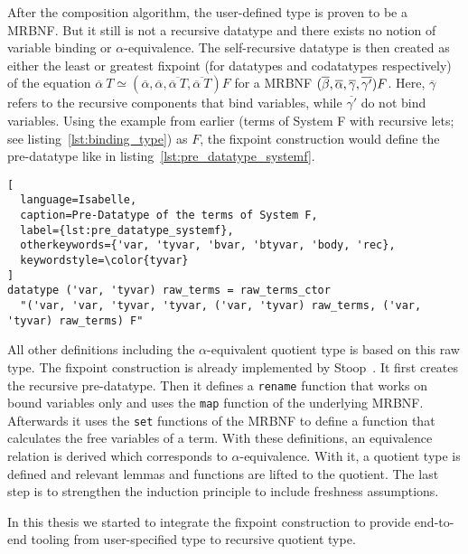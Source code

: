 After the composition algorithm, the user-defined type is proven to be a \ac{MRBNF}. But it still is not a recursive datatype and there exists no notion of variable binding or $\alpha$-equivalence. The self-recursive datatype is then created as either the least or greatest fixpoint (for datatypes and codatatypes respectively) of the equation $\overline{\alpha} \: T \simeq (\overline{\alpha}, \overline{\alpha},\overline{\overline{\alpha} \: T}, \overline{\overline{\alpha} \: T}) F$ for a \ac{MRBNF} $(\overline{\beta}, \overline{\alpha}, \overline{\gamma}, \overline{\gamma'}) F$. Here, $\overline{\gamma}$ refers to the recursive components that bind variables, while $\overline{\gamma'}$ do not bind variables. Using the example from earlier (terms of System F with recursive lets; see listing~\ref{lst:binding_type}) as $F$, the fixpoint construction would define the pre-datatype like in listing~\ref{lst:pre_datatype_systemf}.

\begin{lstlisting}[
  language=Isabelle,
  caption=Pre-Datatype of the terms of System F,
  label={lst:pre_datatype_systemf},
  otherkeywords={'var, 'tyvar, 'bvar, 'btyvar, 'body, 'rec},
  keywordstyle=\color{tyvar}
]
datatype ('var, 'tyvar) raw_terms = raw_terms_ctor
  "('var, 'var, 'tyvar, 'tyvar, ('var, 'tyvar) raw_terms, ('var, 'tyvar) raw_terms) F"
\end{lstlisting}

All other definitions including the $\alpha$-equivalent quotient type is based on this raw type. The fixpoint construction is already implemented by Stoop~\cite{mrbnf_fixpoint}. It first creates the recursive pre-datatype. Then it defines a \texttt{rename} function that works on bound variables only and uses the \texttt{map} function of the underlying \ac{MRBNF}. Afterwards it uses the \texttt{set} functions of the \ac{MRBNF} to define a function that calculates the free variables of a term. With these definitions, an equivalence relation is derived which corresponds to $\alpha$-equivalence. With it, a quotient type is defined and relevant lemmas and functions are lifted to the quotient. The last step is to strengthen the induction principle to include freshness assumptions.

In this thesis we started to integrate the fixpoint construction to provide end-to-end tooling from user-specified type to recursive quotient type.
